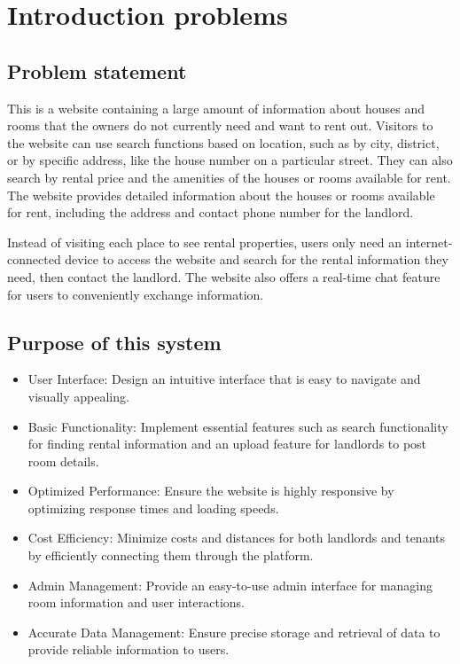 \documentclass[../Main.tex]{subfiles}
\begin{document}
\section{Introduction problems}

\subsection{Problem statement}

This is a website containing a large amount of information about houses and rooms that the owners do not currently need and want to rent out.
Visitors to the website can use search functions based on location, such as by city, district, or by specific address, like the house number on a particular street.
They can also search by rental price and the amenities of the houses or rooms available for rent.
The website provides detailed information about the houses or rooms available for rent, including the address and contact phone number for the landlord.

Instead of visiting each place to see rental properties, users only need an internet-connected device to access the website and search for the rental information they need, then contact the landlord.
The website also offers a real-time chat feature for users to conveniently exchange information.

\subsection{Purpose of this system}

\begin{itemize}
    \item User Interface: Design an intuitive interface that is easy to navigate and visually appealing.
    \item Basic Functionality: Implement essential features such as search functionality for finding rental information and an upload feature for landlords to post room details.
    \item Optimized Performance: Ensure the website is highly responsive by optimizing response times and loading speeds.
    \item Cost Efficiency: Minimize costs and distances for both landlords and tenants by efficiently connecting them through the platform.
    \item Admin Management: Provide an easy-to-use admin interface for managing room information and user interactions.
    \item Accurate Data Management: Ensure precise storage and retrieval of data to provide reliable information to users.
\end{itemize}
\end{document}
